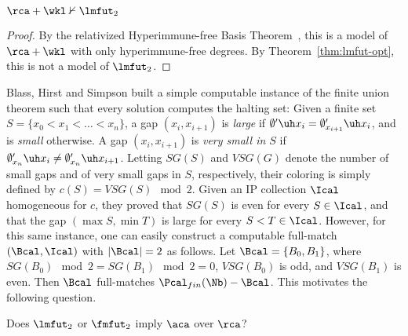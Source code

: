 \begin{corollary}
$\rca + \wkl \nvdash \lmfut_2$
\end{corollary}
\begin{proof}
	By the relativized Hyperimmune-free Basis Theorem~\cite{Jockusch197201},
	this is a model of $\rca + \wkl$ with only hyperimmune-free degrees.
	By Theorem~\ref{thm:lmfut-opt}, this is not a model of $\lmfut_2$.
\end{proof}

Blass, Hirst and Simpson built a simple computable instance of the finite union theorem such that every solution computes the halting set: Given a finite set $S = \{x_0 < x_1 < \dots < x_n\}$, a gap $(x_i, x_{i+1})$ is \emph{large} if $\emptyset'\uh x_i = \emptyset'_{x_{i+1}} \uh x_i$,
	and is \emph{small} otherwise. A gap $(x_i, x_{i+1})$ is \emph{very small in $S$} if $\emptyset'_{x_n} \uh x_i \neq \emptyset'_{x_n} \uh x_{i+1}$.
	Letting $SG(S)$ and $VSG(G)$ denote the number of small gaps and of very small gaps in $S$, respectively, their coloring is simply defined by $c(S) = VSG(S) \mod 2$. Given an IP collection $\Ical$ homogeneous for $c$, they proved that $SG(S)$ is even for every $S \in \Ical$, and that the gap $(\max S, \min T)$ is large for every $S < T \in \Ical$. However, for this same instance, one can easily construct a computable full-match $(\Bcal, \Ical)$ with $|\Bcal| = 2$ as follows. Let $\Bcal = \{B_0, B_1\}$, where $SG(B_0) \mod 2 = SG(B_1) \mod 2 = 0$, $VSG(B_0)$ is odd, and $VSG(B_1)$ is even. Then $\Bcal$ full-matches $\Pcal_{fin}(\Nb) - \Bcal$. This motivates the following question.

\begin{question}
	Does $\lmfut_2$ or $\fmfut_2$ imply $\aca$ over $\rca$?
\end{question}
